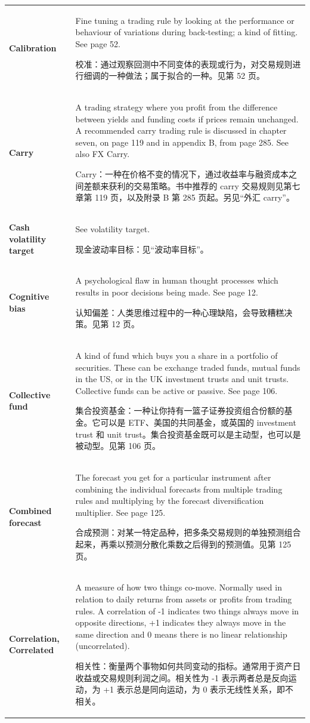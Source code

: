 \begin{chinesetableblock}
{\begin{longtable}{@{}>{\raggedright\arraybackslash\bfseries} p{}>{\raggedright\arraybackslash} p{}@{}}
Calibration & Fine tuning a trading rule by looking at the performance or behaviour of variations during back-testing; a kind of fitting. See page 52. \par 校准：通过观察回测中不同变体的表现或行为，对交易规则进行细调的一种做法；属于拟合的一种。见第 52 页。 \\[0.65em]
Carry & A trading strategy where you profit from the difference between yields and funding costs if prices remain unchanged. A recommended carry trading rule is discussed in chapter seven, on page 119 and in appendix B, from page 285. See also FX Carry. \par Carry：一种在价格不变的情况下，通过收益率与融资成本之间差额来获利的交易策略。书中推荐的 carry 交易规则见第七章第 119 页，以及附录 B 第 285 页起。另见“外汇 carry”。 \\[0.65em]
Cash volatility target & See volatility target. \par 现金波动率目标：见“波动率目标”。 \\[0.65em]
Cognitive bias & A psychological flaw in human thought processes which results in poor decisions being made. See page 12. \par 认知偏差：人类思维过程中的一种心理缺陷，会导致糟糕决策。见第 12 页。 \\[0.65em]
Collective fund & A kind of fund which buys you a share in a portfolio of securities. These can be exchange traded funds, mutual funds in the US, or in the UK investment trusts and unit trusts. Collective funds can be active or passive. See page 106. \par 集合投资基金：一种让你持有一篮子证券投资组合份额的基金。它可以是 ETF、美国的共同基金，或英国的 investment trust 和 unit trust。集合投资基金既可以是主动型，也可以是被动型。见第 106 页。 \\[0.65em]
Combined forecast & The forecast you get for a particular instrument after combining the individual forecasts from multiple trading rules and multiplying by the forecast diversification multiplier. See page 125. \par 合成预测：对某一特定品种，把多条交易规则的单独预测组合起来，再乘以预测分散化乘数之后得到的预测值。见第 125 页。 \\[0.65em]
Correlation, Correlated & A measure of how two things co-move. Normally used in relation to daily returns from assets or profits from trading rules. A correlation of -1 indicates two things always move in opposite directions, +1 indicates they always move in the same direction and 0 means there is no linear relationship (uncorrelated). \par 相关性：衡量两个事物如何共同变动的指标。通常用于资产日收益或交易规则利润之间。相关性为 -1 表示两者总是反向运动，为 +1 表示总是同向运动，为 0 表示无线性关系，即不相关。 \\[0.65em]

\end{longtable}}
\end{chinesetableblock}
